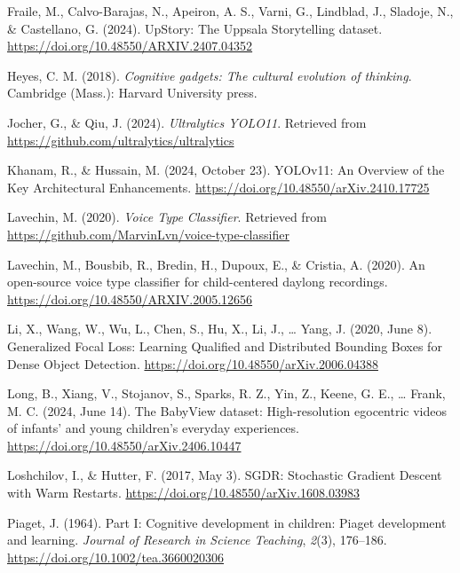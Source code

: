 \documentclass[
  man,floatsintext]{apa6}
\newlength{\cslhangindent}
\newenvironment{CSLReferences}[2] %
 {\begin{list}{}{%
  \setlength{\itemindent}{0pt}
  \setlength{\leftmargin}{0pt}
  \setlength{\parsep}{0pt}
  \ifodd #1
   \setlength{\leftmargin}{\cslhangindent}
   \setlength{\itemindent}{-1\cslhangindent}
  \fi
  \setlength{\itemsep}{#2\baselineskip}}}
 {\end{list}}
\begin{document}
\begin{CSLReferences}{1}{0}
Fraile, M., Calvo-Barajas, N., Apeiron, A. S., Varni, G., Lindblad, J., Sladoje, N., \& Castellano, G. (2024). {UpStory}: The {Uppsala Storytelling} dataset. \url{https://doi.org/10.48550/ARXIV.2407.04352}

Heyes, C. M. (2018). \emph{Cognitive gadgets: The cultural evolution of thinking}. Cambridge (Mass.): Harvard University press.

Jocher, G., \& Qiu, J. (2024). \emph{Ultralytics {YOLO11}}. Retrieved from \url{https://github.com/ultralytics/ultralytics}

Khanam, R., \& Hussain, M. (2024, October 23). {YOLOv11}: {An Overview} of the {Key Architectural Enhancements}. \url{https://doi.org/10.48550/arXiv.2410.17725}

Lavechin, M. (2020). \emph{Voice {Type Classifier}}. Retrieved from \url{https://github.com/MarvinLvn/voice-type-classifier}

Lavechin, M., Bousbib, R., Bredin, H., Dupoux, E., \& Cristia, A. (2020). An open-source voice type classifier for child-centered daylong recordings. \url{https://doi.org/10.48550/ARXIV.2005.12656}

Li, X., Wang, W., Wu, L., Chen, S., Hu, X., Li, J., \ldots{} Yang, J. (2020, June 8). Generalized {Focal Loss}: {Learning Qualified} and {Distributed Bounding Boxes} for {Dense Object Detection}. \url{https://doi.org/10.48550/arXiv.2006.04388}

Long, B., Xiang, V., Stojanov, S., Sparks, R. Z., Yin, Z., Keene, G. E., \ldots{} Frank, M. C. (2024, June 14). The {BabyView} dataset: {High-resolution} egocentric videos of infants' and young children's everyday experiences. \url{https://doi.org/10.48550/arXiv.2406.10447}

Loshchilov, I., \& Hutter, F. (2017, May 3). {SGDR}: {Stochastic Gradient Descent} with {Warm Restarts}. \url{https://doi.org/10.48550/arXiv.1608.03983}

Piaget, J. (1964). Part {I}: {Cognitive} development in children: {Piaget} development and learning. \emph{Journal of Research in Science Teaching}, \emph{2}(3), 176--186. \url{https://doi.org/10.1002/tea.3660020306}


\end{CSLReferences}
\end{document}
